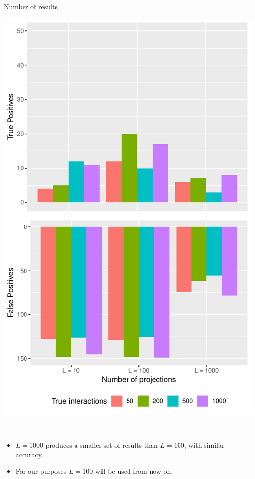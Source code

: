 \documentclass[8pt]{beamer}
\begin{document}
\begin{frame}{Number of results}
\begin{center}
	\begin{minipage}{0.5\linewidth}
		\centering
		\includegraphics[width=\linewidth]{"l_diff/quant_analysis_n10000"}
	\end{minipage}%
	\begin{minipage}{0.1\linewidth}
\ 
	\end{minipage}%
	\begin{minipage}{0.4\linewidth}
		\begin{itemize}
			\item $L = 1000$ produces a smaller set of results than $L=100$, with similar accuracy.
			\item For our purposes $L = 100$ will be used from now on.
		\end{itemize}
	\end{minipage}
\end{center}



\end{frame}
\end{document}
